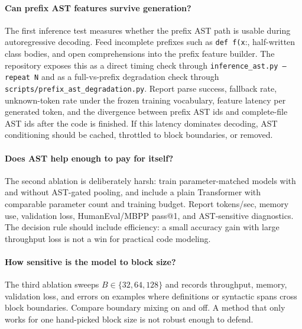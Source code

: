 \documentclass[10pt]{article}
\begin{document}
\paragraph{Can prefix AST features survive generation?}
The first inference test measures whether the prefix AST path is usable during
autoregressive decoding.  Feed incomplete prefixes such as
\texttt{def f(x}:, half-written class bodies, and open comprehensions into the
prefix feature builder.  The repository exposes this as a direct timing check
through \texttt{inference\_ast.py --repeat N} and as a full-vs-prefix
degradation check through \texttt{scripts/prefix\_ast\_degradation.py}.  Report
parse success, fallback rate, unknown-token rate under the frozen training
vocabulary, feature latency per generated token, and the divergence between
prefix AST ids and complete-file AST ids after the code is finished.  If this latency
dominates decoding, AST conditioning should be cached, throttled to block
boundaries, or removed.

\paragraph{Does AST help enough to pay for itself?}
The second ablation is deliberately harsh: train parameter-matched models with
and without AST-gated pooling, and include a plain Transformer with comparable
parameter count and training budget.  Report
tokens/sec, memory use, validation loss, HumanEval/MBPP pass@1, and AST-sensitive
diagnostics.  The decision rule should include efficiency: a small accuracy gain
with large throughput loss is not a win for practical code modeling.

\paragraph{How sensitive is the model to block size?}
The third ablation sweeps $B\in\{32,64,128\}$ and records throughput, memory,
validation loss, and errors on examples where definitions or syntactic spans
cross block boundaries.  Compare boundary mixing on and off.  A method that only
works for one hand-picked block size is not robust enough to defend.
\end{document}
